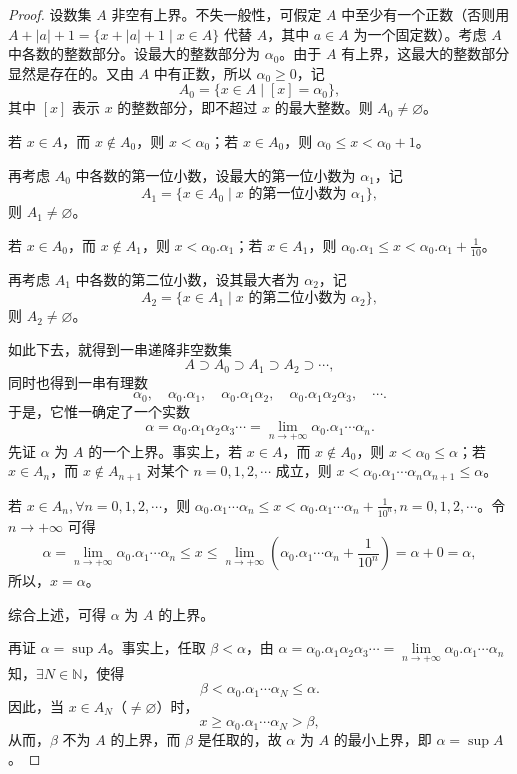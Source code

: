 \begin{proof}
设数集 $A$ 非空有上界。不失一般性，可假定 $A$ 中至少有一个正数（否则用 $A + |a| + 1 = \{x + |a| + 1 \mid x \in A\}$ 代替 $A$，其中 $a \in A$ 为一个固定数）。考虑 $A$ 中各数的整数部分。设最大的整数部分为 $\alpha_0$。由于 $A$ 有上界，这最大的整数部分显然是存在的。又由 $A$ 中有正数，所以 $\alpha_0 \geqslant 0$，记
\[
A_0 = \{x \in A \mid [x] = \alpha_0\},
\]
其中 $[x]$ 表示 $x$ 的整数部分，即不超过 $x$ 的最大整数。则 $A_0 \neq \varnothing$。

若 $x \in A$，而 $x \notin A_0$，则 $x < \alpha_0$；若 $x \in A_0$，则 $\alpha_0 \leqslant x < \alpha_0 + 1$。

再考虑 $A_0$ 中各数的第一位小数，设最大的第一位小数为 $\alpha_1$，记
\[
A_1 = \{x \in A_0 \mid x\text{ 的第一位小数为 }\alpha_1\},
\]
则 $A_1 \neq \varnothing$。

若 $x \in A_0$，而 $x \notin A_1$，则 $x < \alpha_0.\alpha_1$；若 $x \in A_1$，则 $\alpha_0.\alpha_1 \leqslant x < \alpha_0.\alpha_1 + \frac{1}{10}$。

再考虑 $A_1$ 中各数的第二位小数，设其最大者为 $\alpha_2$，记
\[
A_2 = \{x \in A_1 \mid x\text{ 的第二位小数为 }\alpha_2\},
\]
则 $A_2 \neq \varnothing$。

如此下去，就得到一串递降非空数集
\[
A \supset A_0 \supset A_1 \supset A_2 \supset \cdots,
\]
同时也得到一串有理数
\[
\alpha_0,\quad \alpha_0.\alpha_1,\quad \alpha_0.\alpha_1\alpha_2,\quad \alpha_0.\alpha_1\alpha_2\alpha_3,\quad \cdots.
\]
于是，它惟一确定了一个实数
\[
\alpha = \alpha_0.\alpha_1\alpha_2\alpha_3\cdots = \lim_{n\to+\infty} \alpha_0.\alpha_1\cdots\alpha_n.
\]
先证 $\alpha$ 为 $A$ 的一个上界。事实上，若 $x \in A$，而 $x \notin A_0$，则 $x < \alpha_0 \leqslant \alpha$；若 $x \in A_n$，而 $x \notin A_{n+1}$ 对某个 $n = 0, 1, 2, \cdots$ 成立，则 $x < \alpha_0.\alpha_1\cdots\alpha_n\alpha_{n+1} \leqslant \alpha$。

若 $x \in A_n,\forall n = 0, 1, 2, \cdots$，则 $\alpha_0.\alpha_1\cdots\alpha_n \leqslant x < \alpha_0.\alpha_1\cdots\alpha_n + \frac{1}{10^n}, n = 0, 1, 2, \cdots$。令 $n \to +\infty$ 可得
\[
\alpha = \lim_{n\to+\infty} \alpha_0.\alpha_1\cdots\alpha_n \leqslant x \leqslant \lim_{n\to+\infty} \left(\alpha_0.\alpha_1\cdots\alpha_n + \frac{1}{10^n}\right) = \alpha + 0 = \alpha,
\]
所以，$x = \alpha$。

综合上述，可得 $\alpha$ 为 $A$ 的上界。

再证 $\alpha = \sup A$。事实上，任取 $\beta < \alpha$，由 $\alpha = \alpha_0.\alpha_1\alpha_2\alpha_3\cdots = \lim\limits_{n\to+\infty} \alpha_0.\alpha_1\cdots\alpha_n$ 知，$\exists N \in \mathbb{N}$，使得
\[
\beta < \alpha_0.\alpha_1\cdots\alpha_N \leqslant \alpha.
\]
因此，当 $x \in A_N$（$\neq \varnothing$）时，
\[
x \geqslant \alpha_0.\alpha_1\cdots\alpha_N > \beta,
\]
从而，$\beta$ 不为 $A$ 的上界，而 $\beta$ 是任取的，故 $\alpha$ 为 $A$ 的最小上界，即 $\alpha = \sup A$。
\end{proof}

